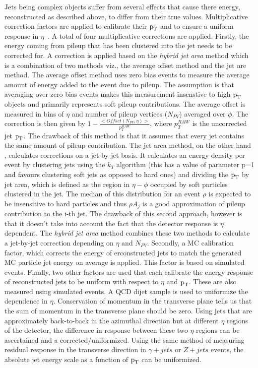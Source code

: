 Jets being complex objects suffer from several effects that cause there energy, reconstructed as described above, to differ from their true values. Multiplicative correction factors are applied to calibrate their $\text{p}_\text{T}$ and to ensure a uniform response in $\eta$~\cite{jet_recon1,jet_recon2}. A total of four multiplicative corrections are applied. Firstly, the energy coming from pileup that has been clustered into the jet needs to be corrected for. A correction is applied based on the \textit{hybrid jet area} method which is a combination of two methods viz., the average offset method and the jet are method. The average offset method uses zero bias events to measure the average amount of energy added to the event due to pileup. The assumption is that averaging over zero bias events makes this measurement insenstive to high $\text{p}_\text{T}$ objects and primarily represents soft pileup contributions. The average offset is measured in bins of $\eta$ and number of pileup vertices ($N_{PV}$) averaged over $\phi$. The correction is then given by $1-\frac{<Offset(N_{PV},\eta)>}{p_{T}^{RAW}}$, where $p_{T}^{RAW}$  is the uncorrected jet $\text{p}_\text{T}$. The drawback of this method is that it assumes that every jet contains the same amount of pileup contribution. The jet area method, on the other hand , calculates corrections on a jet-by-jet basis. It calculates an energy density  per event  by clustering jets using the $k_{T}$ algorithm (this has a value of parameter p=1 and favours clustering soft jets as opposed to hard ones) and dividing the $\text{p}_\text{T}$ by jet area, which is defined as the region in $\eta-\phi$ occupied by soft particles clustered in the jet. The median of this distribution for an event $\rho$ is expected to be insensitive to hard particles and thus $\rho A_{j}$ is a good approximation of pileup contribution to the i-th jet. The drawback of this second approach, however is that it doesn't take into account the fact that the detector response is $\eta$ dependent. The \textit{hybrid jet area} method combines these two methods to calculate a jet-by-jet correction depending on $\eta$ and $N_{PV}$. Secondly, a MC calibration factor, which corrects the energy of erconstructed jets to match the generated MC particle jet energy on average is applied. This factor is based on simulated events. Finally, two other factors are used that each calibrate the energy response of reconstructed jets to be uniform with respect to $\eta$ and $\text{p}_\text{T}$. These are also measured using simulated events. A QCD dijet sample is used to uniformize the dependence in $\eta$. Conservation of momentum in the transverse plane tells us that the sum of momentum in the transverse plane should be zero. Using jets that are approximately back-to-back in the azimuthal direction but at different $\eta$ regions of the detector, the difference in response between these two $\eta$ regions can be ascertained and a corrected/uniformized. Using the same method of measuring residual response in the transverse direction in $\gamma + jets$ or $Z +jets$  events, the absolute jet energy scale as a function of $\text{p}_\text{T}$ can be uniformized.


